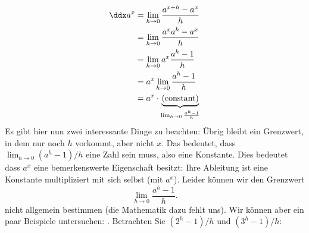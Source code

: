 \begin{align*}
\ddx a^x &=\lim_{h\to 0} \frac{a^{x+h}-a^x}{h} \\
&=\lim_{h\to 0} \frac{a^xa^{h}-a^x}{h} \\
&=\lim_{h\to 0} a^x\frac{a^{h}-1}{h} \\
&=a^x\lim_{h\to 0} \frac{a^{h}-1}{h} \\
&=a^x \cdot \underbrace{\text{(constant)}}_{\lim_{h\to 0} \frac{a^{h}-1}{h}}
\end{align*}
Es gibt hier nun zwei interessante Dinge zu beachten: Übrig bleibt ein Grenzwert, in dem nur noch $h$ vorkommt, aber nicht $x$. Das bedeutet, dass $\lim_{h\to 0} (a^h-1)/h$ eine Zahl sein muss, also eine Konstante. Dies bedeutet dass $a^x$ eine bemerkenswerte Eigenschaft besitzt: Ihre Ableitung ist eine Konstante multipliziert mit sich selbst (mit $a^x$). Leider können wir den Grenzwert
\[
\lim_{h\to 0} \frac{a^h-1}{h}.
\]
nicht allgemein bestimmen (die Mathematik dazu fehlt uns). Wir können aber ein paar Beispiele untersuchen: 
. Betrachten Sie $(2^h-1)/h$ und $(3^h-1)/h$:
